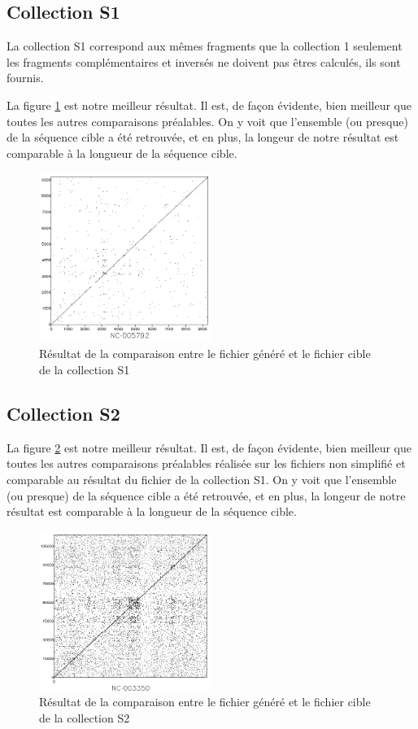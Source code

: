 \documentclass[12pt,a4paper,final]{article}
\begin{document}
\subsection{Collection S1}
La collection S1 correspond aux mêmes fragments que la collection 1 seulement les fragments complémentaires et inversés ne doivent pas êtres calculés, ils sont fournis.

La figure \ref{collS1} est notre meilleur résultat. Il est, de façon évidente, bien meilleur que toutes les autres comparaisons préalables. On y voit que l'ensemble (ou presque) de la séquence cible a été retrouvée, et en plus, la longeur de notre résultat est comparable à la longueur de la séquence cible.

\begin{figure}[!ht]
	\centering
	\includegraphics[width=0.5\textwidth]{images/collectionS1/collectionS1.png}
	\caption{\label{collS1}Résultat de la comparaison entre le fichier généré et le fichier cible de la collection S1}
\end{figure}

\subsection{Collection S2}
La figure \ref{collS2} est notre meilleur résultat. Il est, de façon évidente, bien meilleur que toutes les autres comparaisons préalables réalisée sur les fichiers non simplifié et comparable au résultat du fichier de la collection S1. On y voit que l'ensemble (ou presque) de la séquence cible a été retrouvée, et en plus, la longeur de notre résultat est comparable à la longueur de la séquence cible.

\begin{figure}[!ht]
	\centering
	\includegraphics[width=0.5\textwidth]{images/collectionS2/collectionS2.png}
	\caption{\label{collS2}Résultat de la comparaison entre le fichier généré et le fichier cible de la collection S2}
\end{figure}
\end{document}
